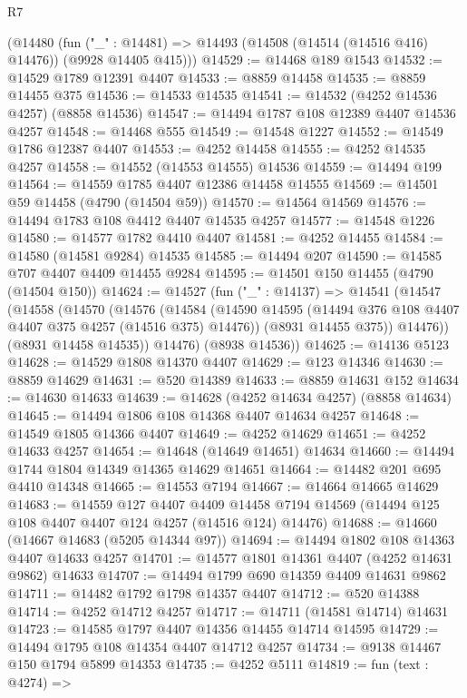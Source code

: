 \begin{lexlean}{R7}
\begin{coremodule}
    (@14480
      (fun ("_" : @14481) => @14493 (@14508 (@14514 (@14516 @416) @14476)) (@9928 @14405 @415)))
@14529 := @14468 @189 @1543
@14532 := @14529 @1789 @12391 @4407
@14533 := @8859 @14458
@14535 := @8859 @14455 @375
@14536 := @14533 @14535
@14541 := @14532 (@4252 @14536 @4257) (@8858 @14536)
@14547 := @14494 @1787 @108 @12389 @4407 @14536 @4257
@14548 := @14468 @555
@14549 := @14548 @1227
@14552 := @14549 @1786 @12387 @4407
@14553 := @4252 @14458
@14555 := @4252 @14535 @4257
@14558 := @14552 (@14553 @14555) @14536
@14559 := @14494 @199
@14564 := @14559 @1785 @4407 @12386 @14458 @14555
@14569 := @14501 @59 @14458 (@4790 (@14504 @59))
@14570 := @14564 @14569
@14576 := @14494 @1783 @108 @4412 @4407 @14535 @4257
@14577 := @14548 @1226
@14580 := @14577 @1782 @4410 @4407
@14581 := @4252 @14455
@14584 := @14580 (@14581 @9284) @14535
@14585 := @14494 @207
@14590 := @14585 @707 @4407 @4409 @14455 @9284
@14595 := @14501 @150 @14455 (@4790 (@14504 @150))
@14624 := @14527
    (fun ("_" : @14137) =>
    @14541
      (@14547
        (@14558
          (@14570
            (@14576
              (@14584
                (@14590 @14595 (@14494 @376 @108 @4407 @4407 @375 @4257 (@14516 @375) @14476))
                (@8931 @14455 @375))
              @14476))
          (@8931 @14458 @14535))
        @14476)
      (@8938 @14536))
@14625 := @14136 @5123
@14628 := @14529 @1808 @14370 @4407
@14629 := @123 @14346
@14630 := @8859 @14629
@14631 := @520 @14389
@14633 := @8859 @14631 @152
@14634 := @14630 @14633
@14639 := @14628 (@4252 @14634 @4257) (@8858 @14634)
@14645 := @14494 @1806 @108 @14368 @4407 @14634 @4257
@14648 := @14549 @1805 @14366 @4407
@14649 := @4252 @14629
@14651 := @4252 @14633 @4257
@14654 := @14648 (@14649 @14651) @14634
@14660 := @14494 @1744 @1804 @14349 @14365 @14629 @14651
@14664 := @14482 @201 @695 @4410 @14348
@14665 := @14553 @7194
@14667 := @14664 @14665 @14629
@14683 := @14559
    @127
    @4407
    @4409
    @14458
    @7194
    @14569
    (@14494 @125 @108 @4407 @4407 @124 @4257 (@14516 @124) @14476)
@14688 := @14660 (@14667 @14683 (@5205 @14344 @97))
@14694 := @14494 @1802 @108 @14363 @4407 @14633 @4257
@14701 := @14577 @1801 @14361 @4407 (@4252 @14631 @9862) @14633
@14707 := @14494 @1799 @690 @14359 @4409 @14631 @9862
@14711 := @14482 @1792 @1798 @14357 @4407
@14712 := @520 @14388
@14714 := @4252 @14712 @4257
@14717 := @14711 (@14581 @14714) @14631
@14723 := @14585 @1797 @4407 @14356 @14455 @14714 @14595
@14729 := @14494 @1795 @108 @14354 @4407 @14712 @4257
@14734 := @9138 @14467 @150 @1794 @5899 @14353
@14735 := @4252 @5111
@14819 := fun (text : @4274) =>

\end{coremodule}
\end{lexlean}
